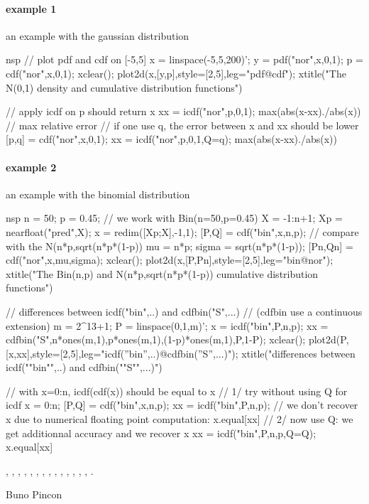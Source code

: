 \begin{examples}
  
\paragraph{example 1} an example with the gaussian distribution
\begin{mintednsp}{nsp}
// plot pdf and cdf on [-5,5]
x = linspace(-5,5,200)';
y = pdf("nor",x,0,1);
p = cdf("nor",x,0,1);
xclear(); plot2d(x,[y,p],style=[2,5],leg="pdf@cdf");
xtitle("The N(0,1) density and cumulative distribution functions")

// apply icdf on p should return x
xx = icdf("nor",p,0,1);
max(abs(x-xx)./abs(x))  // max relative error
// if one use q, the error between x and xx should be lower
[p,q] = cdf("nor",x,0,1);
xx = icdf("nor",p,0,1,Q=q);
max(abs(x-xx)./abs(x))
\end{mintednsp}
  
\paragraph{example 2} an example with the binomial distribution
\begin{mintednsp}{nsp}
n = 50; p = 0.45; // we work with Bin(n=50,p=0.45)
X = -1:n+1; Xp = nearfloat("pred",X);
x = redim([Xp;X],-1,1);
[P,Q] = cdf("bin",x,n,p);
// compare with the N(n*p,sqrt(n*p*(1-p))
mu = n*p; sigma = sqrt(n*p*(1-p));
[Pn,Qn] = cdf("nor",x,mu,sigma);
xclear(); plot2d(x,[P,Pn],style=[2,5],leg="bin@nor");
xtitle("The Bin(n,p) and N(n*p,sqrt(n*p*(1-p)) cumulative distribution functions")

// differences between icdf("bin",..) and cdfbin("S",...)
// (cdfbin use a continuous extension) 
m = 2^13+1;
P = linspace(0,1,m)';
x = icdf("bin",P,n,p);
xx = cdfbin("S",n*ones(m,1),p*ones(m,1),(1-p)*ones(m,1),P,1-P);
xclear(); plot2d(P,[x,xx],style=[2,5],leg="icdf(''bin'',..)@cdfbin(''S'',...)");
xtitle("differences between icdf(""bin"",..) and cdfbin(""S"",...)")

// with x=0:n, icdf(cdf(x)) should be equal to x
// 1/ try without using Q for icdf
x = 0:n;
[P,Q] = cdf("bin",x,n,p);
xx = icdf("bin",P,n,p);
// we don't recover x due to numerical floating point computation:
x.equal[xx]
// 2/ now use Q: we get additionnal accuracy and we recover x
xx = icdf("bin",P,n,p,Q=Q);
x.equal[xx]
\end{mintednsp}
 
\end{examples}

\begin{manseealso}
  , , , 
  , , ,
  , , , , 
  , , , , .
\end{manseealso}


\begin{authors}
  Buno Pincon
\end{authors}

